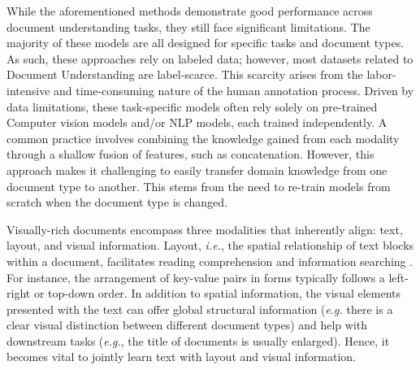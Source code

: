 While the aforementioned methods demonstrate good performance across document understanding tasks, they still face significant limitations. The majority of these models are all designed for specific tasks and document types. As such, these approaches rely on labeled data; however, most datasets related to Document Understanding are label-scarce. This scarcity arises from the labor-intensive and time-consuming nature of the human annotation process. Driven by data limitations, these task-specific models often rely solely on pre-trained Computer vision models and/or \ac{NLP} models, each trained independently. A common practice involves combining the knowledge gained from each modality through a shallow fusion of features, such as concatenation. However, this approach makes it challenging to easily transfer domain knowledge from one document type to another. This stems from the need to re-train models from scratch when the document type is changed.



Visually-rich documents encompass three modalities that inherently align: text, layout, and visual information. Layout, \textit{i.e.}, the spatial relationship of text blocks within a document, facilitates reading comprehension and information searching \citep{meyer1980use, guthrie1991roles, wright1999psychology}. For instance, the arrangement of key-value pairs in forms typically follows a left-right or top-down order. In addition to spatial information, the visual elements presented with the text can offer global structural information (\textit{e.g.} there is a clear visual distinction between different document types) and help with downstream tasks (\textit{e.g.}, the title of documents is usually enlarged). Hence, it becomes vital to jointly learn text with layout and visual information.

